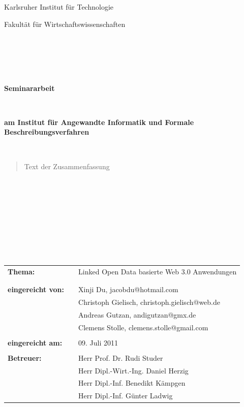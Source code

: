 \documentclass[a4paper, 11pt]{article}
\begin{document}
\thispagestyle{empty}
\begin{center}
\Large{Karlsruher Institut für Technologie}\\
\end{center}

\begin{center}
\Large{Fakultät für Wirtschaftswissenschaften}
\end{center}
\begin{verbatim}





\end{verbatim}
\begin{center}
\textbf{\LARGE{Seminararbeit}}
\end{center}
\begin{verbatim}


\end{verbatim}
\begin{center}
\textbf{am Institut für Angewandte Informatik und Formale Beschreibungsverfahren}
\end{center}
\begin{verbatim}


\end{verbatim}
\begin{abstract} Text der Zusammenfassung \end{abstract}
\begin{verbatim}









\end{verbatim}
\begin{flushleft}
\begin{tabular}{lll}
\textbf{Thema:} & & Linked Open Data basierte Web 3.0 Anwendungen \\
& & \\
& & \\
\textbf{eingereicht von:} & & Xinji Du, \flq{}jacobdu@hotmail.com\frq{}\\
& & Christoph Gielisch, \flq{}christoph.gielisch@web.de\frq{} \\
& & Andreas Gutzan, \flq{}andigutzan@gmx.de\frq{} \\
& & Clemens Stolle, \flq{}clemens.stolle@gmail.com\frq{} \\
& & \\
\textbf{eingereicht am:} & & 09. Juli 2011\\
& & \\
\textbf{Betreuer:} & & Herr Prof. Dr. Rudi Studer \\
& & Herr Dipl.-Wirt.-Ing. Daniel Herzig \\
& & Herr Dipl.-Inf. Benedikt Kämpgen \\
& & Herr Dipl.-Inf. Günter Ladwig
\end{tabular}
\end{flushleft}
\end{document}
